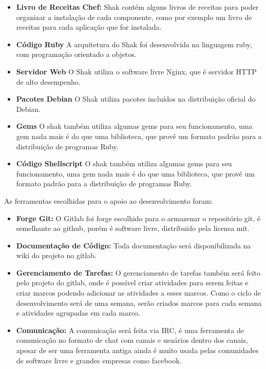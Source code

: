 \begin{itemize}
  \item  \textbf{Livro de Receitas Chef:} Shak contém alguns livros de receitas
  para poder organizar a instalação de cada componente, como por exemplo um livro
  de receitas para cada aplicação que for instalada.
  \item  \textbf{Código Ruby} A arquitetura do Shak foi desenvolvida na linguagem
  ruby, com programação orientado a objetos.
  \item  \textbf{Servidor Web} O Shak utiliza o software livre Nginx, que é
  servidor HTTP de alto desempenho\cite{nginx}.
  \item  \textbf{Pacotes Debian} O Shak utiliza pacotes incluídos na distribuição
  oficial do Debian.
  \item  \textbf{Gems} O shak também utiliza algumas gems para seu funcionamento,
  uma gem nada mais é do que uma biblioteca, que provê um formato padrão para
  a distribuição de programas Ruby\cite{gem}.
  \item  \textbf{Código Shellscript} O shak também utiliza algumas gems para seu funcionamento,
  uma gem nada mais é do que uma biblioteca, que provê um formato padrão para
  a distribuição de programas Ruby\cite{gem}.
\end{itemize}

As ferramentas escolhidas para o apoio ao desenvolvimento foram:
\begin{itemize}
  \item \textbf{Forge Git:} O Gitlab foi forge escolhido para o armazenar o
  repositório git, é semelhante ao github, porém é software livre, distribuido pela
  licensa mit\cite{gitlab}.
  \item \textbf{Documentação de Código:} Toda documentação será disponibilizada
  na wiki do projeto no gitlab.
  \item \textbf{Gerenciamento de Tarefas:} O gerenciamento de tarefas também será
  feito pelo projeto do gitlab, onde é possível criar atividades para serem feitas
  e criar marcos podendo adicionar as atividades a esses marcos. Como o ciclo de
  desenvolvimento será de uma semana, serão criados marcos para cada semana e atividades
  agrupadas em cada marco.
  \item \textbf{Comunicação:} A comunicação será feita via IRC, é uma ferramenta
  de comunicação no formato de chat com canais e usuários dentro dos canais,
  apesar de ser uma ferramenta antiga ainda é muito usada pelas comunidades de software
  livre e grandes empresas como facebook\cite{artigofacebook}.
\end{itemize}

